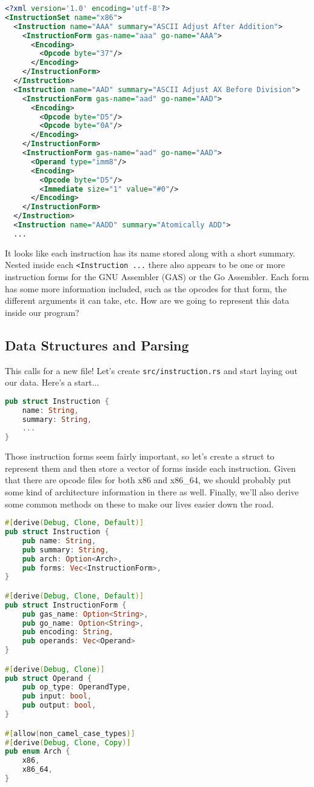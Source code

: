 \begin{lstlisting}[language=xml]
<?xml version='1.0' encoding='utf-8'?>
<InstructionSet name="x86">
  <Instruction name="AAA" summary="ASCII Adjust After Addition">
    <InstructionForm gas-name="aaa" go-name="AAA">
      <Encoding>
        <Opcode byte="37"/>
      </Encoding>
    </InstructionForm>
  </Instruction>
  <Instruction name="AAD" summary="ASCII Adjust AX Before Division">
    <InstructionForm gas-name="aad" go-name="AAD">
      <Encoding>
        <Opcode byte="D5"/>
        <Opcode byte="0A"/>
      </Encoding>
    </InstructionForm>
    <InstructionForm gas-name="aad" go-name="AAD">
      <Operand type="imm8"/>
      <Encoding>
        <Opcode byte="D5"/>
        <Immediate size="1" value="#0"/>
      </Encoding>
    </InstructionForm>
  </Instruction>
  <Instruction name="AADD" summary="Atomically ADD">
  ...
\end{lstlisting}

It looks like each instruction has its name stored along with
a short summary. Nested inside each \texttt{<Instruction ...} there also appears
to be one or more instruction forms for the GNU Assembler (GAS) or the Go Assembler.
Each form has some more information included, such as the opcodes for that form,
the different arguments it can take, etc. How are we going to represent this data
inside our program?

\subsection{Data Structures and Parsing}

This calls for a new file! Let's create \texttt{src/instruction.rs} and start
laying out our data. Here's a start...

\begin{lstlisting}[language=rust]
pub struct Instruction {
    name: String,
    summary: String,
    ...
}
\end{lstlisting}

Those instruction forms seem fairly important, so let's create a struct to represent
them and then store a vector of forms inside each instruction. Given that there
are opcode files for both x86 and x86\_64, we should probably put some kind of
architecture information in there as well. Finally, we'll also derive some common
methods on these to make our lives easier down the road.

\begin{lstlisting}[language=rust]
#[derive(Debug, Clone, Default)]
pub struct Instruction {
    pub name: String,
    pub summary: String,
    pub arch: Option<Arch>,
    pub forms: Vec<InstructionForm>,
}

#[derive(Debug, Clone, Default)]
pub struct InstructionForm {
    pub gas_name: Option<String>,
    pub go_name: Option<String>,
    pub encoding: String,
    pub operands: Vec<Operand>
}

#[derive(Debug, Clone)]
pub struct Operand {
    pub op_type: OperandType,
    pub input: bool,
    pub output: bool,
}

#[allow(non_camel_case_types)]
#[derive(Debug, Clone, Copy)]
pub enum Arch {
    x86,
    x86_64,
}
\end{lstlisting}

